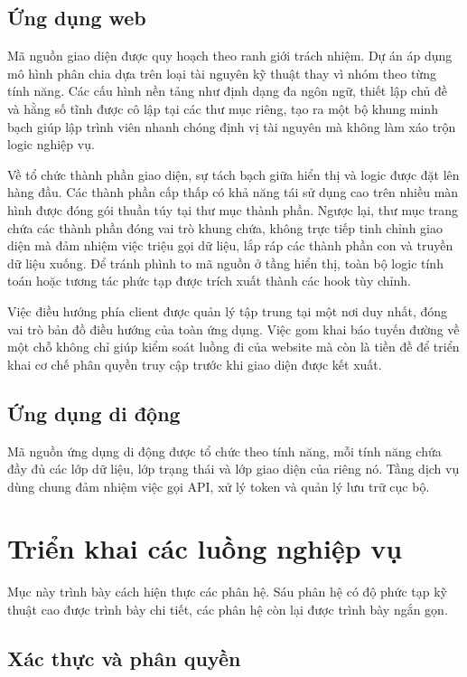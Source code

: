 \documentclass[12pt,a4paper,oneside]{report}
\begin{document}
\subsection{Ứng dụng web}

Mã nguồn giao diện được quy hoạch theo ranh giới trách nhiệm. Dự án áp dụng mô hình phân chia dựa trên loại tài nguyên kỹ thuật thay vì nhóm theo từng tính năng. Các cấu hình nền tảng như định dạng đa ngôn ngữ, thiết lập chủ đề và hằng số tĩnh được cô lập tại các thư mục riêng, tạo ra một bộ khung minh bạch giúp lập trình viên nhanh chóng định vị tài nguyên mà không làm xáo trộn logic nghiệp vụ.

Về tổ chức thành phần giao diện, sự tách bạch giữa hiển thị và logic được đặt lên hàng đầu. Các thành phần cấp thấp có khả năng tái sử dụng cao trên nhiều màn hình được đóng gói thuần túy tại thư mục thành phần. Ngược lại, thư mục trang chứa các thành phần đóng vai trò khung chứa, không trực tiếp tinh chỉnh giao diện mà đảm nhiệm việc triệu gọi dữ liệu, lắp ráp các thành phần con và truyền dữ liệu xuống. Để tránh phình to mã nguồn ở tầng hiển thị, toàn bộ logic tính toán hoặc tương tác phức tạp được trích xuất thành các hook tùy chỉnh.

Việc điều hướng phía client được quản lý tập trung tại một nơi duy nhất, đóng vai trò bản đồ điều hướng của toàn ứng dụng. Việc gom khai báo tuyến đường về một chỗ không chỉ giúp kiểm soát luồng đi của website mà còn là tiền đề để triển khai cơ chế phân quyền truy cập trước khi giao diện được kết xuất.

\subsection{Ứng dụng di động}

Mã nguồn ứng dụng di động được tổ chức theo tính năng, mỗi tính năng chứa đầy đủ các lớp dữ liệu, lớp trạng thái và lớp giao diện của riêng nó. Tầng dịch vụ dùng chung đảm nhiệm việc gọi API, xử lý token và quản lý lưu trữ cục bộ.

\section{Triển khai các luồng nghiệp vụ}

Mục này trình bày cách hiện thực các phân hệ. Sáu phân hệ có độ phức tạp kỹ thuật cao được trình bày chi tiết, các phân hệ còn lại được trình bày ngắn gọn.

\subsection{Xác thực và phân quyền}
\end{document}
